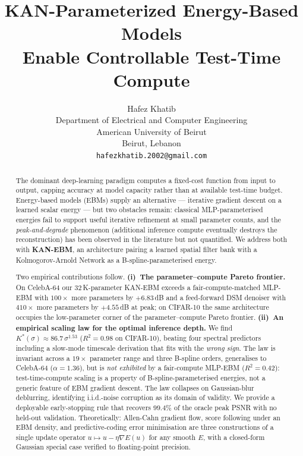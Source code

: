 \documentclass{article}
\title{%
  KAN-Parameterized Energy-Based Models\\
  Enable Controllable Test-Time Compute%
}
\author{%
  Hafez Khatib \\
  Department of Electrical and Computer Engineering \\
  American University of Beirut \\
  Beirut, Lebanon \\
  \texttt{hafezkhatib.2002@gmail.com}
}
\begin{document}
\maketitle

\begin{abstract}
The dominant deep-learning paradigm computes a fixed-cost function from input to output,
capping accuracy at model capacity rather than at available test-time budget. Energy-based
models (EBMs) supply an alternative --- iterative gradient descent on a learned scalar energy
--- but two obstacles remain: classical MLP-parameterised energies fail to support useful
iterative refinement at small parameter counts, and the \emph{peak-and-degrade} phenomenon
(additional inference compute eventually destroys the reconstruction) has been observed in
the literature but not quantified. We address both with \textbf{KAN-EBM}, an architecture
pairing a learned spatial filter bank with a Kolmogorov-Arnold Network as a
B-spline-parameterised energy.

Two empirical contributions follow. \textbf{(i)~The parameter--compute Pareto frontier.} On
CelebA-64 our $32$\,K-parameter KAN-EBM exceeds a fair-compute-matched MLP-EBM with $100\times$
more parameters by $+6.83$\,dB and a feed-forward DSM denoiser with $410\times$ more parameters
by $+4.55$\,dB at peak; on CIFAR-10 the same architecture occupies the low-parameter corner
of the parameter--compute Pareto frontier. \textbf{(ii)~An empirical scaling law for the
optimal inference depth.} We find $K^{*}(\sigma) \approx 86.7\,\sigma^{1.53}$
($R^{2}{=}0.98$ on CIFAR-10), beating four spectral predictors including a slow-mode timescale
derivation that fits with the \emph{wrong sign}. The law is invariant across a $19\times$
parameter range and three B-spline orders, generalises to CelebA-64 ($\alpha{=}1.36$),
but is \emph{not exhibited} by a fair-compute MLP-EBM ($R^{2}{=}0.42$): test-time-compute
scaling is a property of B-spline-parameterised energies, not a generic feature of EBM
gradient descent. The law collapses on Gaussian-blur deblurring, identifying i.i.d.-noise
corruption as its domain of validity. We provide a deployable early-stopping rule that
recovers $99.4\%$ of the oracle peak PSNR with no held-out validation. Theoretically:
Allen-Cahn gradient flow, score following under an EBM density, and predictive-coding error
minimisation are three constructions of a single update operator
$u\!\mapsto\!u-\eta\nabla E(u)$ for any smooth $E$, with a closed-form Gaussian special
case verified to floating-point precision.
\end{abstract}
\end{document}
